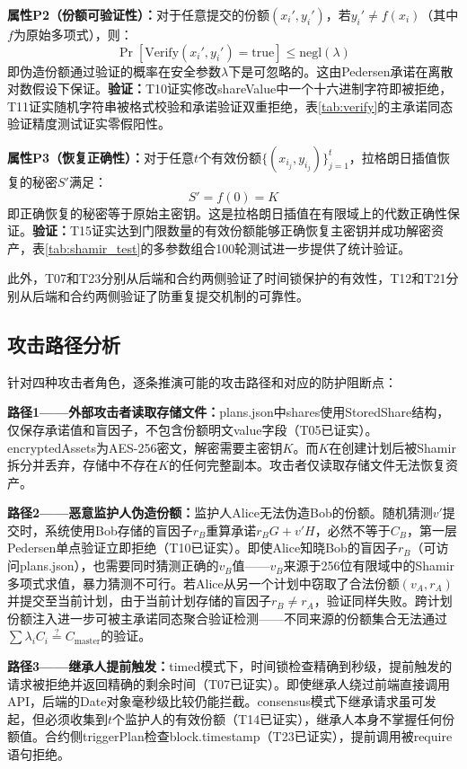 \documentclass[UTF8,a4paper,zihao=-4,openany]{ctexrep}
\begin{document}
\textbf{属性P2（份额可验证性）：}对于任意提交的份额$(x_i', y_i')$，若$y_i' \neq f(x_i)$（其中$f$为原始多项式），则：
\[
\Pr[\text{Verify}(x_i', y_i') = \text{true}] \le \text{negl}(\lambda)
\]
即伪造份额通过验证的概率在安全参数$\lambda$下是可忽略的。这由Pedersen承诺在离散对数假设下保证。\textbf{验证：}T10证实修改shareValue中一个十六进制字符即被拒绝，T11证实随机字符串被格式校验和承诺验证双重拒绝，表\ref{tab:verify}的主承诺同态验证精度测试证实零假阳性。

\textbf{属性P3（恢复正确性）：}对于任意$t$个有效份额$\{(x_{i_j}, y_{i_j})\}_{j=1}^{t}$，拉格朗日插值恢复的秘密$S'$满足：
\[
S' = f(0) = K
\]
即正确恢复的秘密等于原始主密钥。这是拉格朗日插值在有限域上的代数正确性保证。\textbf{验证：}T15证实达到门限数量的有效份额能够正确恢复主密钥并成功解密资产，表\ref{tab:shamir_test}的多参数组合100轮测试进一步提供了统计验证。

此外，T07和T23分别从后端和合约两侧验证了时间锁保护的有效性，T12和T21分别从后端和合约两侧验证了防重复提交机制的可靠性。

\subsection{攻击路径分析}

针对四种攻击者角色，逐条推演可能的攻击路径和对应的防护阻断点：

\textbf{路径1——外部攻击者读取存储文件：}plans.json中shares使用StoredShare结构，仅保存承诺值和盲因子，不包含份额明文value字段（T05已证实）。encryptedAssets为AES-256密文，解密需要主密钥$K$。而$K$在创建计划后被Shamir拆分并丢弃，存储中不存在$K$的任何完整副本。攻击者仅读取存储文件无法恢复资产。

\textbf{路径2——恶意监护人伪造份额：}监护人Alice无法伪造Bob的份额。随机猜测$v'$提交时，系统使用Bob存储的盲因子$r_B$重算承诺$r_BG + v'H$，必然不等于$C_B$，第一层Pedersen单点验证立即拒绝（T10已证实）。即使Alice知晓Bob的盲因子$r_B$（可访问plans.json），也需要同时猜测正确的$v_B$值——$v_B$来源于256位有限域中的Shamir多项式求值，暴力猜测不可行。若Alice从另一个计划中窃取了合法份额$(v_A, r_A)$并提交至当前计划，由于当前计划存储的盲因子$r_B \neq r_A$，验证同样失败。跨计划份额注入进一步可被主承诺同态聚合验证检测——不同来源的份额集合无法通过$\sum \lambda_i C_i \stackrel{?}{=} C_{\text{master}}$的验证。

\textbf{路径3——继承人提前触发：}timed模式下，时间锁检查精确到秒级，提前触发的请求被拒绝并返回精确的剩余时间（T07已证实）。即使继承人绕过前端直接调用API，后端的Date对象毫秒级比较仍能拦截。consensus模式下继承请求虽可发起，但必须收集到$t$个监护人的有效份额（T14已证实），继承人本身不掌握任何份额值。合约侧triggerPlan检查block.timestamp（T23已证实），提前调用被require语句拒绝。
\end{document}

